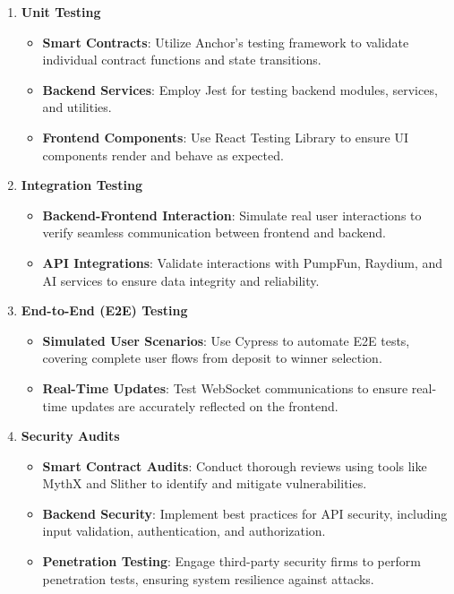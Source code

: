 \documentclass[11pt,a4paper]{article}
\begin{document}
\begin{enumerate}
    \item \textbf{Unit Testing}
    \begin{itemize}
        \item \textbf{Smart Contracts}: Utilize Anchor's testing framework to validate individual contract functions and state transitions.
        \item \textbf{Backend Services}: Employ Jest for testing backend modules, services, and utilities.
        \item \textbf{Frontend Components}: Use React Testing Library to ensure UI components render and behave as expected.
    \end{itemize}
    
    \item \textbf{Integration Testing}
    \begin{itemize}
        \item \textbf{Backend-Frontend Interaction}: Simulate real user interactions to verify seamless communication between frontend and backend.
        \item \textbf{API Integrations}: Validate interactions with PumpFun, Raydium, and AI services to ensure data integrity and reliability.
    \end{itemize}
    
    \item \textbf{End-to-End (E2E) Testing}
    \begin{itemize}
        \item \textbf{Simulated User Scenarios}: Use Cypress to automate E2E tests, covering complete user flows from deposit to winner selection.
        \item \textbf{Real-Time Updates}: Test WebSocket communications to ensure real-time updates are accurately reflected on the frontend.
    \end{itemize}
    
    \item \textbf{Security Audits}
    \begin{itemize}
        \item \textbf{Smart Contract Audits}: Conduct thorough reviews using tools like MythX and Slither to identify and mitigate vulnerabilities.
        \item \textbf{Backend Security}: Implement best practices for API security, including input validation, authentication, and authorization.
        \item \textbf{Penetration Testing}: Engage third-party security firms to perform penetration tests, ensuring system resilience against attacks.
    \end{itemize}
\end{enumerate}
\end{document}
